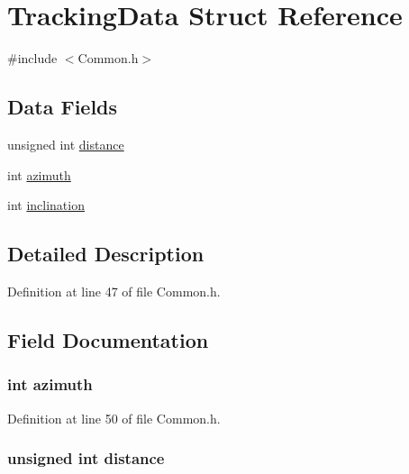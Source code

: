 \hypertarget{struct_tracking_data}{\section{Tracking\+Data Struct Reference}
\label{struct_tracking_data}
}


{\ttfamily \#include $<$Common.\+h$>$}

\subsection*{Data Fields}
\begin{DoxyCompactItemize}
\item 
unsigned int \hyperlink{struct_tracking_data_a4bb47863775a37236bda65273c01b275}{distance}
\item 
int \hyperlink{struct_tracking_data_a866e78e12cb32dcaf1ded89bda8be8f5}{azimuth}
\item 
int \hyperlink{struct_tracking_data_af308b9934394c8bcf7614eb1df2d863f}{inclination}
\end{DoxyCompactItemize}


\subsection{Detailed Description}


Definition at line 47 of file Common.\+h.



\subsection{Field Documentation}
\hypertarget{struct_tracking_data_a866e78e12cb32dcaf1ded89bda8be8f5}{
\subsubsection[{azimuth}]{\setlength{\rightskip}{0pt plus 5cm}int azimuth}}\label{struct_tracking_data_a866e78e12cb32dcaf1ded89bda8be8f5}


Definition at line 50 of file Common.\+h.

\hypertarget{struct_tracking_data_a4bb47863775a37236bda65273c01b275}{
\subsubsection[{distance}]{\setlength{\rightskip}{0pt plus 5cm}unsigned int distance}}\label{struct_tracking_data_a4bb47863775a37236bda65273c01b275}


